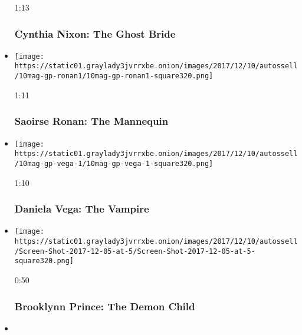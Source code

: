 \begin{itemize}
  1:13

  \hypertarget{cynthia-nixon-the-ghost-bride}{%
  \subsubsection{Cynthia Nixon: The Ghost
  Bride}\label{cynthia-nixon-the-ghost-bride}}
\item
  \href{https://www.nytimes3xbfgragh.onion/video/magazine/100000005588911/the-mannequin.html?action=click\&module=video-series-bar\&region=header\&pgtype=Article\&playlistId=video/magazine}{}

  \texttt{[image: https://static01.graylady3jvrrxbe.onion/images/2017/12/10/autossell/10mag-gp-ronan1/10mag-gp-ronan1-square320.png]}

  1:11

  \hypertarget{saoirse-ronan-the-mannequin}{%
  \subsubsection{Saoirse Ronan: The
  Mannequin}\label{saoirse-ronan-the-mannequin}}
\item
  \href{https://www.nytimes3xbfgragh.onion/video/magazine/100000005588930/daniela-vega-the-vampire.html?action=click\&module=video-series-bar\&region=header\&pgtype=Article\&playlistId=video/magazine}{}

  \texttt{[image: https://static01.graylady3jvrrxbe.onion/images/2017/12/10/autossell/10mag-gp-vega-1/10mag-gp-vega-1-square320.png]}

  1:10

  \hypertarget{daniela-vega-the-vampire}{%
  \subsubsection{Daniela Vega: The
  Vampire}\label{daniela-vega-the-vampire}}
\item
  \href{https://www.nytimes3xbfgragh.onion/video/magazine/100000005588908/brooklynn-prince-the-demon-child.html?action=click\&module=video-series-bar\&region=header\&pgtype=Article\&playlistId=video/magazine}{}

  \texttt{[image: https://static01.graylady3jvrrxbe.onion/images/2017/12/10/autossell/Screen-Shot-2017-12-05-at-5/Screen-Shot-2017-12-05-at-5-square320.png]}

  0:50

  \hypertarget{brooklynn-prince-the-demon-child}{%
  \subsubsection{Brooklynn Prince: The Demon
  Child}\label{brooklynn-prince-the-demon-child}}
\item
  \href{https://www.nytimes3xbfgragh.onion/video/magazine/100000005588876/jake-gyllenhaal-the-damned.html?action=click\&module=video-series-bar\&region=header\&pgtype=Article\&playlistId=video/magazine}{}


\end{itemize}
